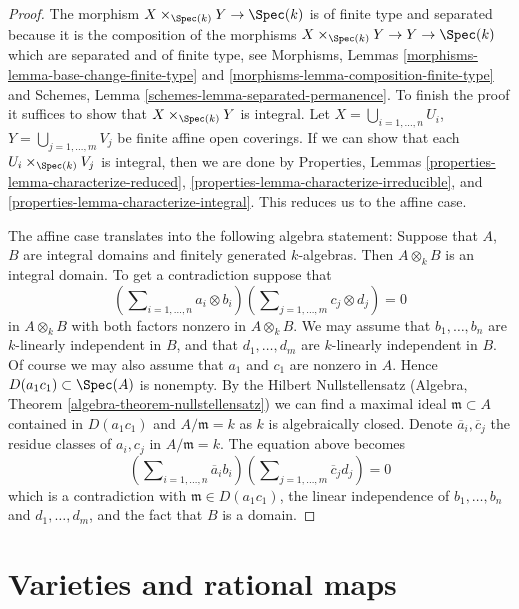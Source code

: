 \begin{proof}
The morphism $X \times_{\Spec(k)} Y \to \Spec(k)$ is of
finite type and separated because it is the composition of the
morphisms $X \times_{\Spec(k)} Y \to Y \to \Spec(k)$
which are separated and of finite type, see
Morphisms, Lemmas \ref{morphisms-lemma-base-change-finite-type} and
\ref{morphisms-lemma-composition-finite-type}
and
Schemes, Lemma \ref{schemes-lemma-separated-permanence}.
To finish the proof it suffices to show that $X \times_{\Spec(k)} Y$
is integral.
Let $X = \bigcup_{i = 1, \ldots, n} U_i$,
$Y = \bigcup_{j = 1, \ldots, m} V_j$ be finite affine open coverings.
If we can show that each $U_i \times_{\Spec(k)} V_j$ is integral,
then we are done by
Properties, Lemmas \ref{properties-lemma-characterize-reduced},
\ref{properties-lemma-characterize-irreducible}, and
\ref{properties-lemma-characterize-integral}.
This reduces us to the affine case.

\medskip\noindent
The affine case translates into the following algebra statement: Suppose
that $A$, $B$ are integral domains and finitely generated $k$-algebras.
Then $A \otimes_k B$ is an integral domain. To get a contradiction suppose that
$$
(\sum\nolimits_{i = 1, \ldots, n} a_i \otimes b_i)
(\sum\nolimits_{j = 1, \ldots, m} c_j \otimes d_j) = 0
$$
in $A \otimes_k B$ with both factors nonzero in $A \otimes_k B$.
We may assume that $b_1, \ldots, b_n$ are $k$-linearly
independent in $B$, and that $d_1, \ldots, d_m$ are $k$-linearly independent
in $B$. Of course we may also assume that $a_1$ and $c_1$ are nonzero
in $A$. Hence $D(a_1c_1) \subset \Spec(A)$ is nonempty. By the
Hilbert Nullstellensatz
(Algebra, Theorem \ref{algebra-theorem-nullstellensatz})
we can find a maximal ideal $\mathfrak m \subset A$ contained in
$D(a_1c_1)$ and $A/\mathfrak m = k$ as $k$ is algebraically closed.
Denote $\overline{a}_i, \overline{c}_j$ the residue classes of
$a_i, c_j$ in $A/\mathfrak m = k$. The equation above becomes
$$
(\sum\nolimits_{i = 1, \ldots, n} \overline{a}_i b_i)
(\sum\nolimits_{j = 1, \ldots, m} \overline{c}_j d_j) = 0
$$
which is a contradiction with
$\mathfrak m \in D(a_1c_1)$, the linear independence of
$b_1, \ldots, b_n$ and $d_1, \ldots, d_m$, and the fact that $B$ is a domain.
\end{proof}






\section{Varieties and rational maps}
\label{section-varieties-rational-maps}


